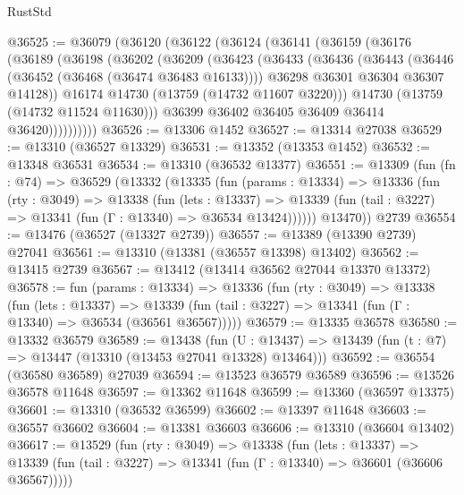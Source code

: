 \begin{lexlean}{RustStd}
\begin{coremodule}
@36525 := @36079
    (@36120
      (@36122
        (@36124
          (@36141
            (@36159
              (@36176
                (@36189
                  (@36198
                    (@36202
                      (@36209
                        (@36423
                          (@36433
                            (@36436
                              (@36443
                                (@36446 (@36452 (@36468 (@36474 @36483 @16133))))
                                @36298
                                @36301
                                @36304
                                @36307
                                @14128))
                            @16174
                            @14730
                            (@13759 (@14732 @11607 @3220)))
                          @14730
                          (@13759 (@14732 @11524 @11630)))
                        @36399
                        @36402
                        @36405
                        @36409
                        @36414
                        @36420))))))))))
@36526 := @13306 @1452
@36527 := @13314 @27038
@36529 := @13310 (@36527 @13329)
@36531 := @13352 (@13353 @1452)
@36532 := @13348 @36531
@36534 := @13310 (@36532 @13377)
@36551 := @13309
    (fun (fn : @74) =>
    @36529
      (@13332
        (@13335
          (fun (params : @13334) =>
          @13336
            (fun (rty : @3049) =>
            @13338
              (fun (lets : @13337) =>
              @13339 (fun (tail : @3227) => @13341 (fun (Γ : @13340) => @36534 @13424))))))
        @13470))
    @2739
@36554 := @13476 (@36527 (@13327 @2739))
@36557 := @13389 (@13390 @2739) @27041
@36561 := @13310 (@13381 (@36557 @13398) @13402)
@36562 := @13415 @2739
@36567 := @13412 (@13414 @36562 @27044 @13370 @13372)
@36578 := fun (params : @13334) =>
  @13336
    (fun (rty : @3049) =>
    @13338
      (fun (lets : @13337) =>
      @13339 (fun (tail : @3227) => @13341 (fun (Γ : @13340) => @36534 (@36561 @36567)))))
@36579 := @13335 @36578
@36580 := @13332 @36579
@36589 := @13438
    (fun (U : @13437) => @13439 (fun (t : @7) => @13447 (@13310 (@13453 @27041 @13328) @13464)))
@36592 := @36554 (@36580 @36589) @27039
@36594 := @13523 @36579 @36589
@36596 := @13526 @36578 @11648
@36597 := @13362 @11648
@36599 := @13360 (@36597 @13375)
@36601 := @13310 (@36532 @36599)
@36602 := @13397 @11648
@36603 := @36557 @36602
@36604 := @13381 @36603
@36606 := @13310 (@36604 @13402)
@36617 := @13529
    (fun (rty : @3049) =>
    @13338
      (fun (lets : @13337) =>
      @13339 (fun (tail : @3227) => @13341 (fun (Γ : @13340) => @36601 (@36606 @36567)))))

\end{coremodule}
\end{lexlean}
